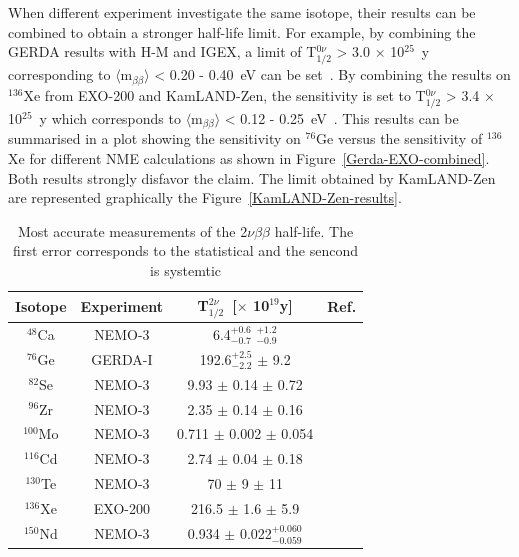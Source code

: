 \documentclass[main.tex]{subfiles}
\begin{document}
\NI When different experiment investigate the same isotope, their results can be combined to obtain a stronger half-life limit. For example, by combining the GERDA results with H-M and IGEX, a limit of T$_{\text{1/2}}^{\text{0}\nu}$ > 3.0 $\times$ 10$^{\text{25}}$~y corresponding to $\langle \text{m}_{\beta\beta} \rangle$ < 0.20 - 0.40~eV can be set~\cite{GERDA}.  By combining the results on $^{\text{136}}$Xe from EXO-200 and KamLAND-Zen, the sensitivity is set to T$_{\text{1/2}}^{\text{0}\nu}$ > 3.4 $\times$ 10$^{\text{25}}$~y which corresponds to $\langle \text{m}_{\beta\beta} \rangle$ < 0.12 - 0.25~eV~\cite{KamLAND-Zen}. This results can be summarised in a plot showing the sensitivity on $^{\text{76}}$Ge versus the sensitivity of $^{\text{136}}$Xe for different NME calculations as shown in Figure~\ref{Gerda-EXO-combined}. Both results strongly disfavor the claim. The limit obtained by KamLAND-Zen are represented graphically the Figure~\ref{KamLAND-Zen-results}.


\begin{table}[h!]
\centering
\begin{tabular}{cccc}
\toprule
Isotope & Experiment & T$_{\text{1/2}}^{\text{2}\nu}$~[$\times$ 10$^{\text{19}}$y]& Ref. \\
\midrule
$^{\text{48}}$Ca  & NEMO-3  & 6.4$^{+\text{0.6}}_{-\text{0.7}}$ $^{+\text{1.2}}_{-\text{0.9}}$ & \cite{NEMO3:Ca48} \\[0.1cm]
$^{\text{76}}$Ge  & GERDA-I & 192.6$^{+\text{2.5}}_{-\text{2.2}}$ $\pm$ 9.2 & \cite{Gerda2nubb} \\[0.1cm]
$^{\text{82}}$Se  & NEMO-3  & 9.93 $\pm$ 0.14 $\pm$ 0.72 & \cite{ThesisJMott} \\[0.1cm]
$^{\text{96}}$Zr  & NEMO-3  & 2.35 $\pm$ 0.14 $\pm$ 0.16 & \cite{NEMO3:Zr96} \\[0.1cm]
$^{\text{100}}$Mo & NEMO-3  & 0.711 $\pm$ 0.002 $\pm$ 0.054 & \cite{NEMO3:Mo100-pre} \\[0.1cm]
$^{\text{116}}$Cd & NEMO-3  & 2.74 $\pm$ 0.04 $\pm$ 0.18 & \cite{Arnold2016bed} \\[0.1cm]
$^{\text{130}}$Te & NEMO-3  & 70 $\pm$ 9 $\pm$ 11 & \cite{NEMO3:Te130} \\[0.1cm]
$^{\text{136}}$Xe & EXO-200 & 216.5 $\pm$ 1.6 $\pm$ 5.9 & \cite{EXO-200-2nubb} \\[0.1cm]
$^{\text{150}}$Nd & NEMO-3  & 0.934 $\pm$ 0.022$^{+\text{0.060}}_{-\text{0.059}}$  & \cite{NEMO3:Nd150} \\
\bottomrule
\end{tabular}
\caption{Most accurate measurements of the 2$\nu\beta\beta$ half-life. The first error corresponds to the statistical and the sencond is systemtic}
\label{tab:summaryBB2NUmeasurements}
\end{table}
\end{document}
